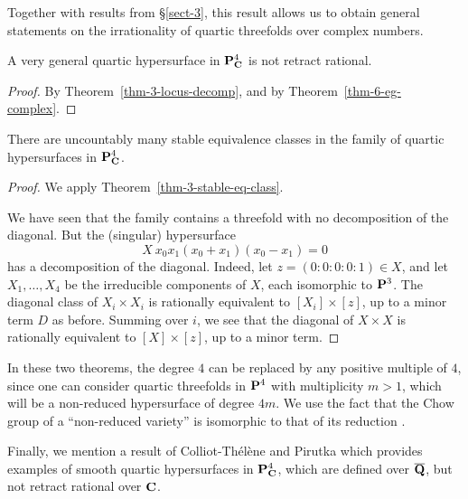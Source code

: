 Together with results from \S\ref{sect-3},
this result allows us to obtain general statements 
on the irrationality of quartic threefolds over complex numbers.

\begin{theorem}  \label{thm-3-quartic-threefold}
    A very general quartic hypersurface in $\bbP_{\bbC}^4$ is not retract rational.
\end{theorem}

\begin{proof}
    By Theorem~\ref{thm-3-locus-decomp}, and by Theorem~\ref{thm-6-eg-complex}.
\end{proof}

\begin{theorem} \label{thm-3-stable-eq-threefolds}
    There are uncountably many stable equivalence classes in
    the family of quartic hypersurfaces in $\bbP_{\bbC}^4$.
\end{theorem}

\begin{proof}
    We apply Theorem~\ref{thm-3-stable-eq-class}.

    We have seen that the family contains
    a threefold with no decomposition of the diagonal.
    But the (singular) hypersurface 
    \[ X \: x_0 x_1 (x_0 + x_1) (x_0 - x_1) = 0 \]
    has a decomposition of the diagonal.
    Indeed, let $z = (0:0:0:0:1) \in X$,
    and let $X_1, \dotsc, X_4$ be the irreducible components of $X$, each isomorphic to $\bbP^3$.
    The diagonal class of $X_i \times X_i$ is rationally equivalent to $[X_i] \times [z]$,
    up to a minor term $D$ as before.
    Summing over $i$, we see that the diagonal of $X \times X$ is 
    rationally equivalent to $[X] \times [z]$, up to a minor term.
\end{proof}

\begin{remark} \label{rem-3-quaric-threefold}
    In these two theorems, the degree $4$ can be replaced by any positive multiple of $4$,
    since one can consider quartic threefolds in $\bbP^4$ with 
    multiplicity $m > 1$, 
    which will be a non-reduced hypersurface of degree $4m$.
    We use the fact that the Chow group of a ``non-reduced variety''
    is isomorphic to that of its reduction \cite[Example~1.3.1]{fulton}.
\end{remark}

Finally, we mention a result of Colliot-Thélène and Pirutka which provides examples of smooth quartic hypersurfaces 
in $\bbP_{\bbC}^4$, which are defined over $\bbQbar$, but not retract rational over $\bbC$.

